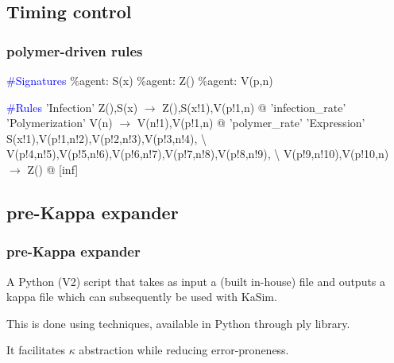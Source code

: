 \documentclass[xcolor=dvipsnames]{beamer}
\begin{document}
\subsection{Timing control}
\begin{frame}
  \frametitle{polymer-driven rules}
  \begin{flushleft}
    \textcolor{blue}{\#Signatures} \newline
    \%agent: S(x) \newline
    \%agent: Z() \newline
    \%agent: V(p,n) \pause
    \item \textcolor{blue}{\#Rules} \newline
    'Infection' Z(),S(x) $\rightarrow$ Z(),S(x!1),V(p!1,n) @ 'infection\_rate' \newline \pause
    'Polymerization' V(n) $\rightarrow$ V(n!1),V(p!1,n) @ 'polymer\_rate' \newline \pause
    'Expression' S(x!1),V(p!1,n!2),V(p!2,n!3),V(p!3,n!4), \textbackslash \newline
    V(p!4,n!5),V(p!5,n!6),V(p!6,n!7),V(p!7,n!8),V(p!8,n!9), \textbackslash \newline
    V(p!9,n!10),V(p!10,n) $\rightarrow$ Z() @ [inf]
  \end{flushleft}
\end{frame}

\subsection{pre-Kappa expander}
\begin{frame}
  \frametitle{pre-Kappa expander}
  \begin{flushleft}
    A Python (V2) script that takes as input a (built in-house)  file and outputs a kappa file which can subsequently be used with KaSim. \pause
    \item This is done using  techniques, available in Python through ply library. \pause
    \item It facilitates $\kappa$ abstraction while reducing error-proneness.
  \end{flushleft}
\end{frame}
\end{document}
